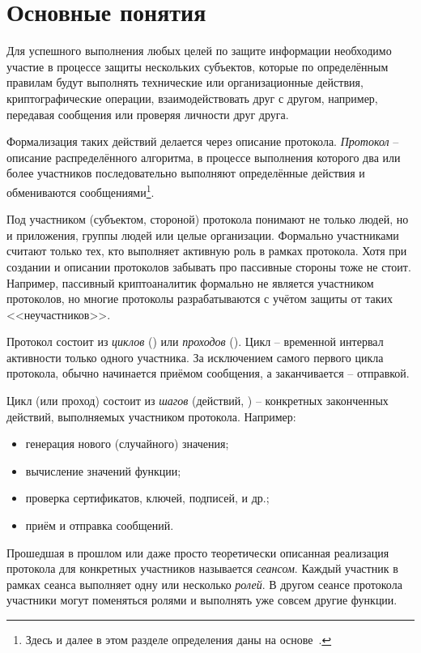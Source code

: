 \section{Основные понятия}
Для успешного выполнения любых целей по защите информации необходимо участие в процессе защиты нескольких субъектов, которые по определённым правилам будут выполнять технические или организационные действия, криптографические операции, взаимодействовать друг с другом, например, передавая сообщения или проверяя личности друг друга.

Формализация таких действий делается через описание протокола. \emph{Протокол} -- описание распределённого алгоритма, в процессе выполнения которого два или более участников последовательно выполняют определённые действия и обмениваются сообщениями\footnote{Здесь и далее в этом разделе определения даны на основе~\cite{Cheremushkin:2009}.}.

Под участником (субъектом, стороной) протокола понимают не только людей, но и приложения, группы людей или целые организации. Формально участниками считают только тех, кто выполняет активную роль в рамках протокола. Хотя при создании и описании протоколов забывать про пассивные стороны тоже не стоит. Например, пассивный криптоаналитик формально не является участником протоколов, но многие протоколы разрабатываются с учётом защиты от таких <<неучастников>>.

Протокол состоит из \emph{циклов} () или \emph{проходов} (). Цикл -- временной интервал активности только одного участника. За исключением самого первого цикла протокола, обычно начинается приёмом сообщения, а заканчивается -- отправкой.

Цикл (или проход) состоит из \emph{шагов} (действий, ) -- конкретных законченных действий, выполняемых участником протокола. Например:
\begin{itemize}
	\item генерация нового (случайного) значения;
	\item вычисление значений функции;
	\item проверка сертификатов, ключей, подписей, и др.;
	\item приём и отправка сообщений.
\end{itemize}

Прошедшая в прошлом или даже просто теоретически описанная реализация протокола для конкретных участников называется \emph{сеансом}. Каждый участник в рамках сеанса выполняет одну или несколько \emph{ролей}. В другом сеансе протокола участники могут поменяться ролями и выполнять уже совсем другие функции.

